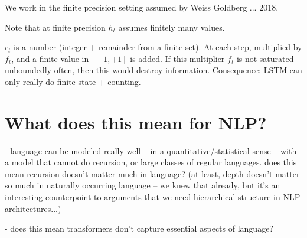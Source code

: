 \documentclass[11pt,a4paper]{article}
\begin{document}
We work in the finite precision setting assumed by Weiss Goldberg ... 2018.

Note that at finite precision $h_t$ assumes finitely many values.

$c_t$ is a number (integer + remainder from a finite set). At each step, multiplied by $f_t$, and a finite value in $[-1,+1]$ is added.
If this multiplier $f_t$ is not saturated unboundedly often, then this would destroy information.
Consequence: LSTM can only really do finite state + counting.


\section{What does this mean for NLP?}

- language can be modeled really well -- in a quantitative/statistical sense -- with a model that cannot do recursion, or large classes of regular languages. does this mean recursion doesn't matter much in language? (at least, depth doesn't matter so much in naturally occurring language -- we knew that already, but it's an interesting counterpoint to arguments that we need hierarchical structure in NLP architectures...)

- does this mean transformers don't capture essential aspects of language?





\end{document}
